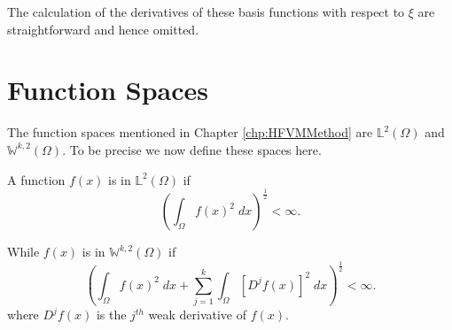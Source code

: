 The calculation of the derivatives of these basis functions with respect to $\xi$ are straightforward and hence omitted. 

\section{Function Spaces}
The function spaces mentioned in Chapter \ref{chp:HFVMMethod} are $\mathbb{L}^2(\Omega)$ and $\mathbb{W}^{k,2}(\Omega)$. To be precise we now define these spaces here. 

A function $f(x)$ is in $\mathbb{L}^2(\Omega)$ if
\begin{equation*}
\left( \int_{\Omega} f(x)^2 \; dx \right)^{\frac{1}{2}} < \infty.
\end{equation*}

While $f(x)$ is in $\mathbb{W}^{k,2}(\Omega)$ if 
\begin{equation*}
\left( \int_{\Omega} f(x)^2 \; dx + \sum^k_{j=1}  \int_{\Omega} \left[D^j f(x) \right]^2 \; dx  \right)^{\frac{1}{2}} < \infty.
\end{equation*}
where $D^j f(x)$ is the $j^{th}$ weak derivative of $f(x)$. 
